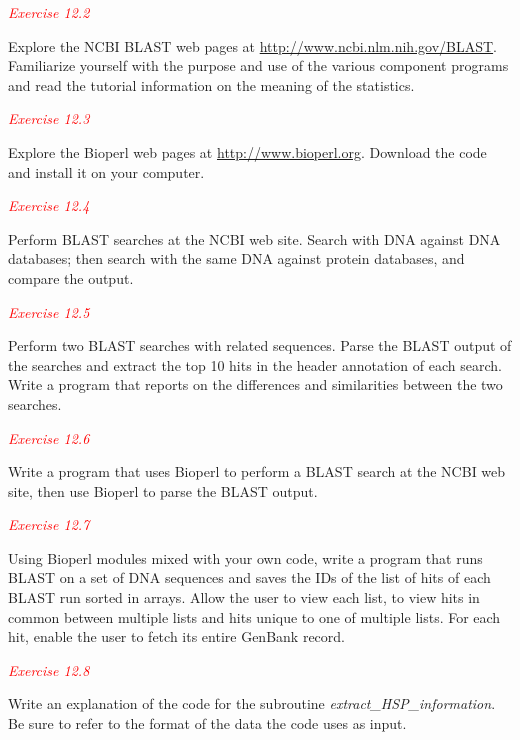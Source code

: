\textcolor{red}{\textit{Exercise 12.2}}
\begin{adjustwidth}{1cm}{}
  Explore the NCBI BLAST web pages at \href{http://www.ncbi.nlm.nih.gov/BLAST}{http://www.ncbi.nlm.nih.gov/BLAST}. Familiarize yourself with the purpose and use of the various component programs and read the tutorial information on the meaning of the statistics. 
\end{adjustwidth}

\textcolor{red}{\textit{Exercise 12.3}}
\begin{adjustwidth}{1cm}{}
  Explore the Bioperl web pages at \href{http://www.bioperl.org}{http://www.bioperl.org}. Download the code and install it on your computer. 
\end{adjustwidth}

\textcolor{red}{\textit{Exercise 12.4}}
\begin{adjustwidth}{1cm}{}
Perform BLAST searches at the NCBI web site. Search with DNA against DNA databases; then search with the same DNA against protein databases, and compare the output.
\end{adjustwidth}

\textcolor{red}{\textit{Exercise 12.5}}
\begin{adjustwidth}{1cm}{}
Perform two BLAST searches with related sequences. Parse the BLAST output of the searches and extract the top 10 hits in the header annotation of each search. Write a program that reports on the differences and similarities between the two searches.
\end{adjustwidth}

\textcolor{red}{\textit{Exercise 12.6}}
\begin{adjustwidth}{1cm}{}
Write a program that uses Bioperl to perform a BLAST search at the NCBI web site, then use Bioperl to parse the BLAST output. 
\end{adjustwidth}

\textcolor{red}{\textit{Exercise 12.7}}
\begin{adjustwidth}{1cm}{}
Using Bioperl modules mixed with your own code, write a program that runs BLAST on a set of DNA sequences and saves the IDs of the list of hits of each BLAST run sorted in arrays. Allow the user to view each list, to view hits in common between multiple lists and hits unique to one of multiple lists. For each hit, enable the user to fetch its entire GenBank record. 
\end{adjustwidth}

\textcolor{red}{\textit{Exercise 12.8}}
\begin{adjustwidth}{1cm}{}
Write an explanation of the code for the subroutine \textit{extract\_HSP\_information}. Be sure to refer to the format of the data the code uses as input. 
\end{adjustwidth}

